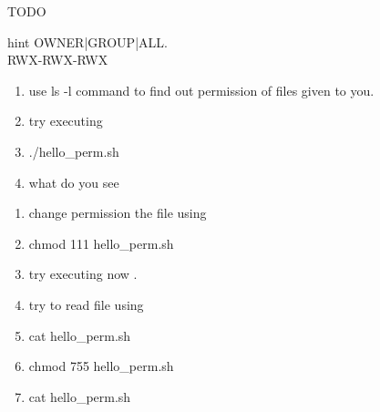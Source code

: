 \documentclass{beamer}
\newcounter{saveenumi}
\newcommand{\seti}{\setcounter{saveenumi}{\value{enumi}}}
\newcommand{\conti}{\setcounter{enumi}{\value{saveenumi}}}
\begin{document}
{%
	\begin{frame}{TODO}
		\begin{block}{hint}
		OWNER|GROUP|ALL. \\
		RWX-RWX-RWX\\
		\end{block}
		\begin{enumerate}
			\item<1->	use ls -l command to find out permission of files given to you.
			\item<2->	try executing 
			\item<2->		./hello\_perm.sh 
			\item<2->	what do you see	
			\seti		
		\end{enumerate}

	\end{frame}
	
	\begin{frame}
		\begin{enumerate}
			\conti
			\item<1->	change permission the file using 
			\item<1->		chmod 111 hello\_perm.sh
			\item<1->	try executing now  . 
			\item<2->	try to read file using 
			\item<2->	cat hello\_perm.sh
			\item<2->		chmod 755 hello\_perm.sh 
			\item<2->	cat hello\_perm.sh
		\end{enumerate}
	\end{frame}
}
\end{document}
